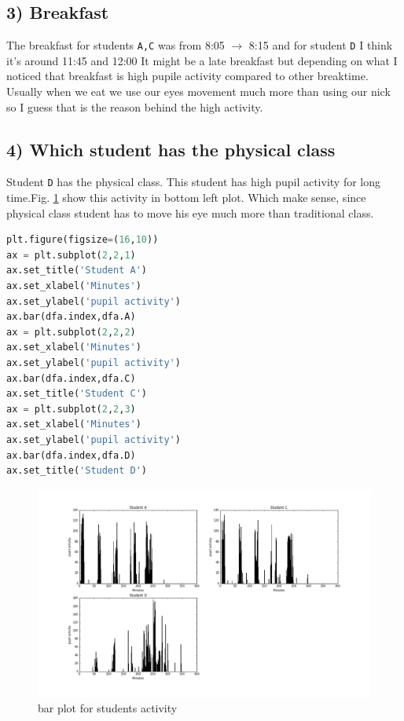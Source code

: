 \documentclass[10pt]{article}
\begin{document}
\subsection*{3) Breakfast}
The breakfast for students \texttt{A,C} was from 8:05 \(\rightarrow\) 8:15 and for student \texttt{D} I think it's around 11:45 and 12:00 It might be a late breakfast but depending on what I noticed that breakfast is high pupile activity compared to other breaktime. Usually when we eat we use our eyes movement much more than using our nick so I guess that is the reason behind the high activity.
\subsection*{4) Which student has the physical class}
Student \texttt{D} has the physical class. This student has high pupil activity for long time.Fig. \ref{fig:2} show this activity in bottom left plot. Which make sense, since physical class student has to move his eye much more than traditional class.
\begin{lstlisting}[language=python]
plt.figure(figsize=(16,10))
ax = plt.subplot(2,2,1)
ax.set_title('Student A')
ax.set_xlabel('Minutes')
ax.set_ylabel('pupil activity')
ax.bar(dfa.index,dfa.A)
ax = plt.subplot(2,2,2)
ax.set_xlabel('Minutes')
ax.set_ylabel('pupil activity')
ax.bar(dfa.index,dfa.C)
ax.set_title('Student C')
ax = plt.subplot(2,2,3)
ax.set_xlabel('Minutes')
ax.set_ylabel('pupil activity')
ax.bar(dfa.index,dfa.D)
ax.set_title('Student D')
\end{lstlisting}

\begin{figure}[H]
\hspace{-70px}
\includegraphics[scale=0.5]{bar.png}
\caption{bar plot for students activity \label{fig:2}}
\end{figure}
\end{document}
